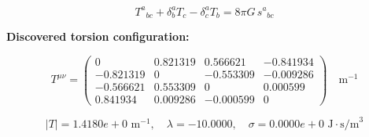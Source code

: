 
\begin{equation}
  T^a{}_{bc} + \delta^a_b T_c - \delta^a_c T_b = 8\pi G \, s^a{}_{bc}
\end{equation}

\textbf{Discovered torsion configuration:}

\begin{equation}
  T^{\mu\nu} = \begin{pmatrix}
    0 & 0.821319 & 0.566621 & -0.841934 \\
    -0.821319 & 0 & -0.553309 & -0.009286 \\
    -0.566621 & 0.553309 & 0 & 0.000599 \\
    0.841934 & 0.009286 & -0.000599 & 0
  \end{pmatrix} \quad \text{m}^{-1}
\end{equation}

\begin{equation}
  |T| = 1.4180e+0 \text{ m}^{-1}, \quad
  \lambda = -10.0000, \quad
  \sigma = 0.0000e+0 \text{ J}\cdot\text{s/m}^3
\end{equation}